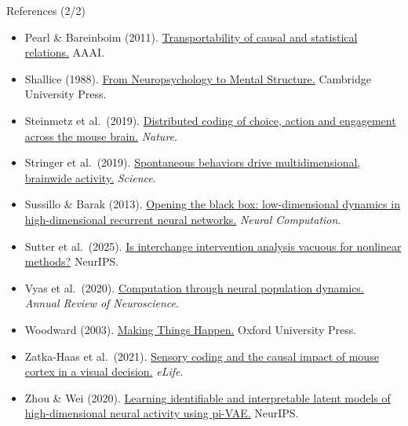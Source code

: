 \documentclass[aspectratio=169,11pt]{beamer}
\begin{document}
\begin{frame}{References (2/2)}
\vspace{-0.3em}
{\scriptsize
\begin{itemize}\setlength\itemsep{0pt}
  \item Pearl \& Bareinboim (2011). \href{https://arxiv.org/abs/1203.3519}{Transportability of causal and statistical relations.} AAAI.
  \item Shallice (1988). \href{https://doi.org/10.1017/CBO9780511526817}{From Neuropsychology to Mental Structure.} Cambridge University Press.
  \item Steinmetz et al.\ (2019). \href{https://doi.org/10.1038/s41586-019-1787-x}{Distributed coding of choice, action and engagement across the mouse brain.} \textit{Nature}.
  \item Stringer et al.\ (2019). \href{https://doi.org/10.1126/science.aav7893}{Spontaneous behaviors drive multidimensional, brainwide activity.} \textit{Science}.
  \item Sussillo \& Barak (2013). \href{https://doi.org/10.1162/NECO_a_00409}{Opening the black box: low-dimensional dynamics in high-dimensional recurrent neural networks.} \textit{Neural Computation}.
  \item Sutter et al.\ (2025). \href{https://arxiv.org/abs/2501.02043}{Is interchange intervention analysis vacuous for nonlinear methods?} NeurIPS.
  \item Vyas et al.\ (2020). \href{https://doi.org/10.1146/annurev-neuro-092619-094115}{Computation through neural population dynamics.} \textit{Annual Review of Neuroscience}.
  \item Woodward (2003). \href{https://doi.org/10.1093/0195155270.001.0001}{Making Things Happen.} Oxford University Press.
  \item Zatka-Haas et al.\ (2021). \href{https://doi.org/10.7554/eLife.63163}{Sensory coding and the causal impact of mouse cortex in a visual decision.} \textit{eLife}.
  \item Zhou \& Wei (2020). \href{https://arxiv.org/abs/2011.04798}{Learning identifiable and interpretable latent models of high-dimensional neural activity using pi-VAE.} NeurIPS.
\end{itemize}
}
\end{frame}
\end{document}

